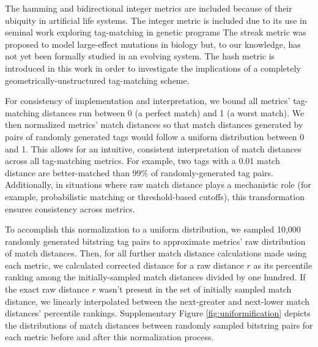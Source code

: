 The hamming and bidirectional integer metrics are included because of their ubiquity in artificial life systems.
The integer metric is included due to its use in seminal work exploring tag-matching in genetic programs \citep{spector2011tag, spector2011s,spector2012tag}
The streak metric was proposed to model large-effect mutations in biology but, to our knowledge, has not yet been formally studied in an evolving system.
The hash metric is introduced in this work in order to investigate the implications of a completely geometrically-unstructured tag-matching scheme.

For consistency of implementation and interpretation, we bound all metrics' tag-matching distances run between 0 (a perfect match) and 1 (a worst match).
We then normalized metrics' match distances so that match distances generated by pairs of randomly generated tags would follow a uniform distribution between 0 and 1.
This allows for an intuitive, consistent interpretation of match distances across all tag-matching metrics.
For example, two tags with a 0.01 match distance are better-matched than 99\% of randomly-generated tag pairs.
Additionally, in situations where raw match distance plays a mechanistic role (for example, probabilistic matching or threshold-based cutoffs), this transformation ensures consistency across metrics.

To accomplish this normalization to a uniform distribution, we sampled 10,000 randomly generated bitstring tag pairs to approximate metrics' raw distribution of match distances.
Then, for all further match distance calculations made using each metric, we calculated corrected distance for a raw distance $r$ as its percentile ranking among the initially-sampled match distances divided by one hundred.
If the exact raw distance $r$ wasn't present in the set of initially sampled match distance, we linearly interpolated between the next-greater and next-lower match distances' percentile rankings.
Supplementary Figure \ref{fig:uniformification} depicts the distributions of match distances between randomly sampled bitstring pairs for each metric before and after this normalization process.


